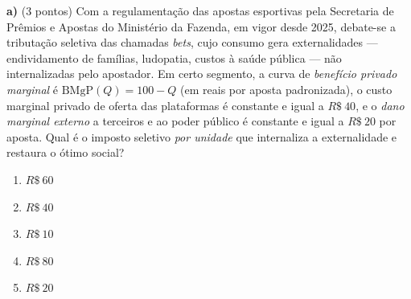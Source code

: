 \textbf{a)} (3 pontos) Com a regulamentação das apostas esportivas pela Secretaria de Prêmios e Apostas do Ministério da Fazenda, em vigor desde 2025, debate-se a tributação seletiva das chamadas \emph{bets}, cujo consumo gera externalidades --- endividamento de famílias, ludopatia, custos à saúde pública --- não internalizadas pelo apostador. Em certo segmento, a curva de \emph{benefício privado marginal} é $\text{BMgP}(Q)=100-Q$ (em reais por aposta padronizada), o custo marginal privado de oferta das plataformas é constante e igual a $R\$~40$, e o \emph{dano marginal externo} a terceiros e ao poder público é constante e igual a $R\$~20$ por aposta. Qual é o imposto seletivo \emph{por unidade} que internaliza a externalidade e restaura o ótimo social?

\begin{enumerate}[label=\Alph*., leftmargin=3.2em, itemsep=0.15em, topsep=0.2em]
  \item $R\$~60$
  \item $R\$~40$
  \item $R\$~10$
  \item $R\$~80$
  \item $R\$~20$
\end{enumerate}
